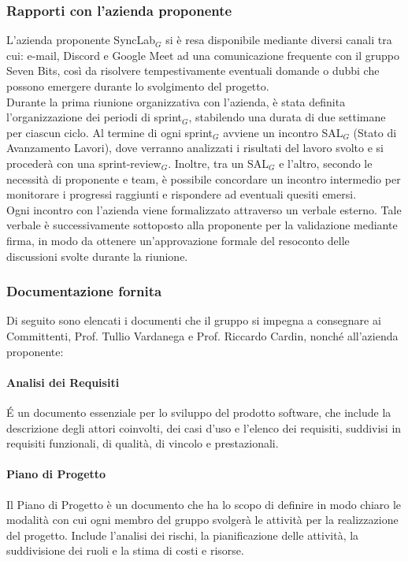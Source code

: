 \documentclass[10pt]{article}
\begin{document}
\begin{justify}
    \subsubsection{Rapporti con l'azienda proponente}
    L'azienda proponente SyncLab$_G$ si è resa disponibile mediante diversi canali tra cui: e-mail, Discord e Google Meet ad una comunicazione frequente con il gruppo Seven Bits, così da risolvere tempestivamente eventuali domande o dubbi che possono emergere durante lo svolgimento del progetto.\\
    Durante la prima riunione organizzativa con l'azienda, è stata definita l'organizzazione dei periodi di sprint$_G$, stabilendo una durata di due settimane per ciascun ciclo. Al termine di ogni sprint$_G$ avviene un incontro SAL$_G$ (Stato di Avanzamento Lavori), dove verranno analizzati i risultati del lavoro svolto e si procederà con una sprint-review$_G$. Inoltre, tra un SAL$_G$ e l'altro, secondo le necessità di proponente e team, è possibile concordare un incontro intermedio per monitorare i progressi raggiunti e rispondere ad eventuali quesiti emersi.\\
    Ogni incontro con l'azienda viene formalizzato attraverso un verbale esterno. Tale verbale è successivamente sottoposto alla proponente per la validazione mediante firma, in modo da ottenere un'approvazione formale del resoconto delle discussioni svolte durante la riunione.\\

    \subsubsection{Documentazione fornita}
    Di seguito sono elencati i documenti che il gruppo si impegna a consegnare ai Committenti, Prof. Tullio Vardanega e Prof. Riccardo Cardin, nonché all'azienda proponente:\\

        \paragraph{Analisi dei Requisiti}
        \'E un documento essenziale per lo sviluppo del prodotto software, che include la descrizione degli attori coinvolti, dei casi d’uso e l’elenco dei requisiti, suddivisi in requisiti funzionali, di qualità, di vincolo e prestazionali.\\

        \paragraph{Piano di Progetto}
        Il Piano di Progetto è un documento che ha lo scopo di definire in modo chiaro le modalità con cui ogni membro del gruppo svolgerà le attività per la realizzazione del progetto. Include l'analisi dei rischi, la pianificazione delle attività, la suddivisione dei ruoli e la stima di costi e risorse.\\


\end{justify}
\end{document}
